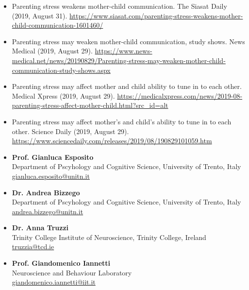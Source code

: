 \documentclass[10pt,a4paper]{altacv}
\begin{document}
\begin{fullwidth}
\begin{itemize}
			\item Parenting stress weakens mother-child communication. The Siasat Daily (2019, August 31). \url{https://www.siasat.com/parenting-stress-weakens-mother-child-communication-1601460/}
			\item Parenting stress may weaken mother-child communication, study shows. News Medical (2019, August 29). \url{https://www.news-medical.net/news/20190829/Parenting-stress-may-weaken-mother-child-communication-study-shows.aspx}
			\item Parenting stress may affect mother and child ability to tune in to each other. Medical Xpress (2019, August 29). \url{https://medicalxpress.com/news/2019-08-parenting-stress-affect-mother-child.html?src_id=alt}
			\item Parenting stress may affect mother's and child's ability to tune in to each other. Science Daily (2019, August 29). \url{https://www.sciencedaily.com/releases/2019/08/190829101059.htm}	
			
		\end{itemize}
		

		
		\newpage
		
		
		\begin{itemize}
			\item \textbf{Prof. Gianluca Esposito}\\
			Department of Pscyhology and Cognitive Science, University of Trento, Italy\\
			\href{mailto:gianluca.esposito@unitn.it}{gianluca.esposito@unitn.it}

			\item \textbf{Dr. Andrea Bizzego}\\
			Department of Pscyhology and Cognitive Science, University of Trento, Italy\\
			\href{mailto:andrea.bizzego@unitn.it}{andrea.bizzego@unitn.it}
			
			\item \textbf{Dr. Anna Truzzi}\\
			Trinity College Institute of Neuroscience, Trinity College, Ireland\\
			\href{mailto:truzzia@tcd.ie}{truzzia@tcd.ie}
			
			
			\item \textbf{Prof. Giandomenico Iannetti}\\
			Neuroscience and Behaviour Laboratory\\
			\href{mailto:giandomenico.iannetti@iit.it}{giandomenico.iannetti@iit.it}

		\end{itemize}
		
	\end{fullwidth}
	
\end{document}
